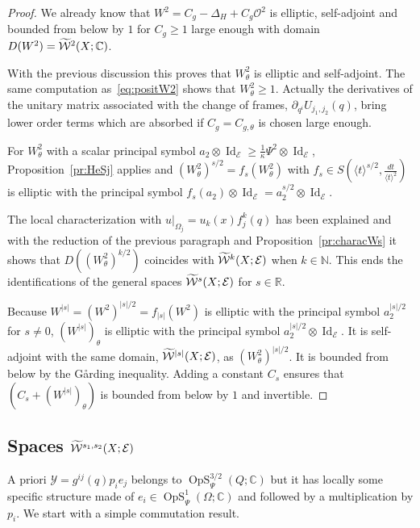 \documentclass[10pt]{amsart}
\theoremstyle{definition}\newtheorem{defi}[theo]{Definition}\newtheorem{rema}[theo]{Remark}\newtheorem{exam}[theo]{Example}\newtheorem{exem}[theo]{Example}\newtheorem{nota}[theo]{Notation}
\newcommand{\C}{\mathbb{C}}
\newcommand{\R}{\mathbb{R}}
\newcommand{\N}{\mathbb{N}}
\newcommand{\clW}{\mathcal{W}}
\newcommand{\clY}{\mathcal{Y}}
\newcommand{\clO}{\mathcal{O}}
\newcommand{\clE}{\mathcal{E}}
\DeclareMathOperator{\OpS}{OpS}
\DeclareMathOperator{\Idd}{Id}
\let\oldtilde\tilde
\renewcommand*{\tilde}[1]{\mathchoice{\widetilde{#1}}{\widetilde{#1}}{\oldtilde{#1}}{\oldtilde{#1}}}
\begin{document}
\begin{proof}
We already know that $W^{2}=C_{g}-\Delta_{H}+C_{g}\clO^{2}$ is elliptic, self-adjoint and bounded from below by $1$ for $C_{g}\geq 1$ large enough with domain $D(W^{2})=\tilde{\clW}^{2}(X;\C)$.

With the previous discussion this proves that $W^{2}_{\theta}$ is elliptic and self-adjoint. The same computation as~\eqref{eq:positW2} shows that $W^{2}_{\theta}\geq 1$. Actually the derivatives of the unitary matrix associated with the change of frames, $\partial_{q^{i}}U_{j_{1},j_{2}}(q)$, bring lower order terms which are absorbed if $C_{g}=C_{g,\theta}$ is chosen large enough.

For $W^{2}_{\theta}$ with a scalar principal symbol $a_{2}\otimes\Idd_{\clE}\geq \frac{1}{\kappa}\Psi^{2}\otimes \Idd_{\clE}$, Proposition~\ref{pr:HeSj} applies and $(W^{2}_{\theta})^{s/2}=f_{s}(W^{2}_{\theta})$ with $f_{s}\in S(\langle t\rangle^{s/2},\frac{dt}{\langle t\rangle^{2}})$ is elliptic with the principal symbol $f_{s}(a_{2})\otimes\Idd_{\clE}=a_{2}^{s/2}\otimes \Idd_{\clE}$.

The local characterization with $u|_{\Omega_{j}}=u_{k}(x)f_{j}^{k}(q)$ has been explained and with the reduction of the previous paragraph and Proposition~\ref{pr:characWs} it shows that $D((W^{2}_{\theta})^{k/2})$ coincides with $\tilde{\clW}^{k}(X;\clE)$ when $k\in \N$. This ends the identifications of the general spaces $\tilde{\clW}^{s}(X;\clE)$ for $s\in \R$.

Because $W^{|s|}=(W^{2})^{|s|/2}=f_{|s|}(W^{2})$ is elliptic with the principal symbol $a_{2}^{|s|/2}$ for $s\neq 0$, $(W^{|s|})_{\theta}$ is elliptic with the principal symbol $a_{2}^{|s|/2}\otimes \Idd_{\clE}$. It is self-adjoint with the same domain, $\tilde{\clW}^{|s|}(X;\clE)$, as $(W^{2}_{\theta})^{|s|/2}$. It is bounded from below by the G\aa rding inequality. Adding a constant $C_{s}$ ensures that $(C_{s}+(W^{|s|})_{\theta})$ is bounded from below by $1$ and invertible.
\end{proof}

\subsection{Spaces \texorpdfstring{$\tilde{\clW}^{s_{1},s_{2}}(X;\clE)$}{W\^s\_1,s\_2(X;E)}}

A priori $\clY=g^{ij}(q)p_{i}e_{j}$ belongs to $\OpS_{\Psi}^{3/2}(Q;\C)$ but it has locally some specific structure made of $e_{i}\in \OpS_{\Psi}^{1}(\Omega;\C)$ and followed by a multiplication by $p_{i}$. We start with a simple commutation result.
\end{document}
